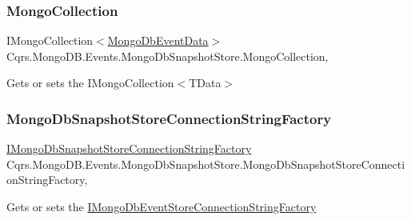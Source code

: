 \subsubsection{\texorpdfstring{Mongo\+Collection}{MongoCollection}}
{\footnotesize\ttfamily I\+Mongo\+Collection$<$\hyperlink{classCqrs_1_1MongoDB_1_1Events_1_1MongoDbEventData}{Mongo\+Db\+Event\+Data}$>$ Cqrs.\+Mongo\+D\+B.\+Events.\+Mongo\+Db\+Snapshot\+Store.\+Mongo\+Collection\hspace{0.3cm}{\ttfamily [get]}, {\ttfamily [protected]}}



Gets or sets the I\+Mongo\+Collection$<$\+T\+Data$>$ 

\mbox{\label{classCqrs_1_1MongoDB_1_1Events_1_1MongoDbSnapshotStore_a8e5a5b89b00194a1307a31f4dce718e7_a8e5a5b89b00194a1307a31f4dce718e7}} 
\subsubsection{\texorpdfstring{Mongo\+Db\+Snapshot\+Store\+Connection\+String\+Factory}{MongoDbSnapshotStoreConnectionStringFactory}}
{\footnotesize\ttfamily \hyperlink{interfaceCqrs_1_1MongoDB_1_1Events_1_1IMongoDbSnapshotStoreConnectionStringFactory}{I\+Mongo\+Db\+Snapshot\+Store\+Connection\+String\+Factory} Cqrs.\+Mongo\+D\+B.\+Events.\+Mongo\+Db\+Snapshot\+Store.\+Mongo\+Db\+Snapshot\+Store\+Connection\+String\+Factory\hspace{0.3cm}{\ttfamily [get]}, {\ttfamily [protected]}}



Gets or sets the \hyperlink{interfaceCqrs_1_1MongoDB_1_1Events_1_1IMongoDbEventStoreConnectionStringFactory}{I\+Mongo\+Db\+Event\+Store\+Connection\+String\+Factory} 

